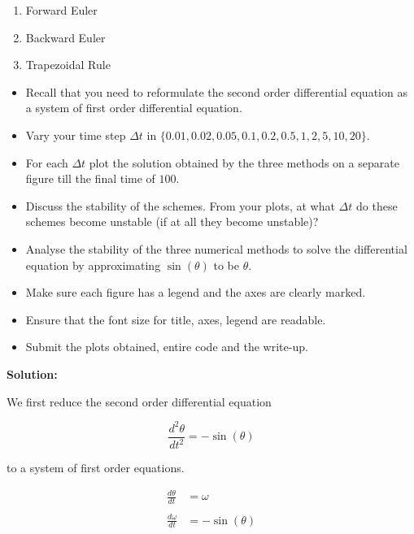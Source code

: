\documentclass[a4paper,11pt]{report}
\begin{document}
\begin{enumerate}
    \begin{enumerate}
    \item Forward Euler
    \item Backward Euler
    \item Trapezoidal Rule
    \end{enumerate}

    \begin{itemize}
    \item Recall that you need to reformulate the second order differential equation as a
    system of first order differential equation.
    \item Vary your time step $\Delta t$ in $\{0.01, 0.02, 0.05, 0.1, 0.2, 0.5, 1, 2, 5,
    10, 20\}$.
    \item For each $\Delta t$ plot the solution obtained by the three methods on a separate
    figure till the final time of $100$.
    \item Discuss the stability of the schemes. From your plots, at what $\Delta t$ do these
    schemes become unstable (if at all they become unstable)?
    \item Analyse the stability of the three numerical methods to solve the differential
    equation by approximating $\sin(\theta)$ to be $\theta$.
    \item Make sure each figure has a legend and the axes are clearly marked.
    \item Ensure that the font size for title, axes, legend are readable.
    \item Submit the plots obtained, entire code and the write-up.
    \end{itemize}


    \textbf{Solution:}

    We first reduce the second order differential equation

    \begin{equation*}
    \frac{d^{2} \theta}{dt^{2}} = - \sin(\theta)
    \end{equation*}

    to a system of first order equations.

    \begin{equation*}
    \begin{aligned}
    \frac{d \theta}{dt} &= \omega \\ \\
    \frac{d \omega}{dt} &= -\sin(\theta)
    \end{aligned}
    \end{equation*}


\end{enumerate}
\end{document}
